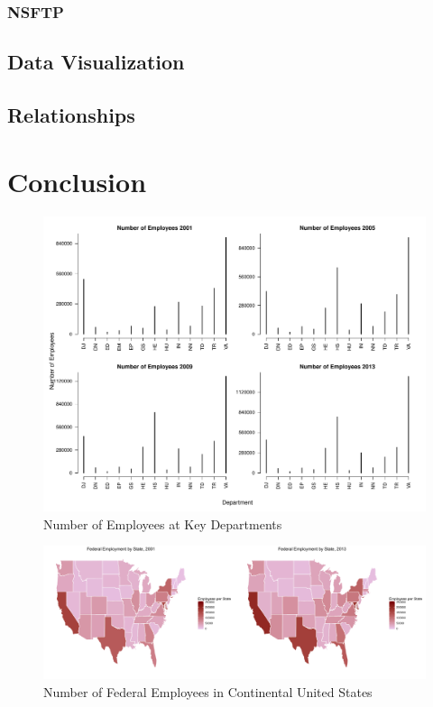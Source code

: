 \documentclass{article}
\begin{document}
        \subsubsection{NSFTP}

    \subsection{Data Visualization}

    \subsection{Relationships}

\section{Conclusion}

\newpage

\begin{center}
    \begin{figure}
        \includegraphics[scale=0.4]{./images/simple-stat-agency.pdf}
        \caption{Number of Employees at Key Departments}
        \label{simpleagency}
    \end{figure}
\end{center}

\begin{center}
    \begin{figure}
        \includegraphics[scale=0.3]{./images/employment-by-state-2001-2013.png}
        \caption{Number of Federal Employees in Continental United States}
        \label{employmentheatmap}
    \end{figure}
\end{center}
\end{document}

